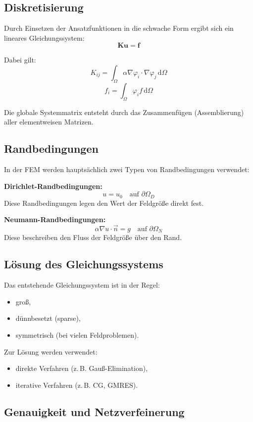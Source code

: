 \documentclass[a4paper]{article}
\begin{document}
\subsection{Diskretisierung}

Durch Einsetzen der Ansatzfunktionen in die schwache Form ergibt sich ein lineares Gleichungssystem:
\[
\mathbf{K} \mathbf{u} = \mathbf{f}
\]

Dabei gilt:
\[
K_{ij} = \int_{\Omega} \alpha \nabla \varphi_i \cdot \nabla \varphi_j \, \mathrm{d}\Omega
\]
\[
f_i = \int_{\Omega} \varphi_i f \, \mathrm{d}\Omega
\]

Die globale Systemmatrix entsteht durch das Zusammenfügen (Assemblierung) aller elementweisen Matrizen.

\subsection{Randbedingungen}

In der FEM werden hauptsächlich zwei Typen von Randbedingungen verwendet:

\textbf{Dirichlet-Randbedingungen:}
\[
u = u_0 \quad \text{auf } \partial \Omega_D
\]
Diese Randbedingungen legen den Wert der Feldgröße direkt fest.

\textbf{Neumann-Randbedingungen:}
\[
\alpha \nabla u \cdot \vec{n} = g \quad \text{auf } \partial \Omega_N
\]
Diese beschreiben den Fluss der Feldgröße über den Rand.

\subsection{Lösung des Gleichungssystems}

Das entstehende Gleichungssystem ist in der Regel:
\begin{itemize}
    \item groß,
    \item dünnbesetzt (sparse),
    \item symmetrisch (bei vielen Feldproblemen).
\end{itemize}

Zur Lösung werden verwendet:
\begin{itemize}
    \item direkte Verfahren (z.\,B. Gauß-Elimination),
    \item iterative Verfahren (z.\,B. CG, GMRES).
\end{itemize}

\subsection{Genauigkeit und Netzverfeinerung}
\end{document}
